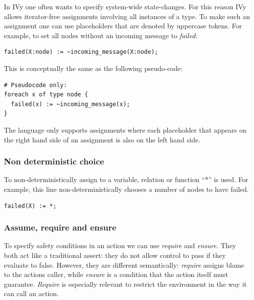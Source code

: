 \documentclass[fleqn]{article}
\begin{document}
In IVy one often wants to specify system-wide state-changes. For this reason IVy allows iterator-free assignments involving all instances of a type. To make such an assignment one can use placeholders that are denoted by uppercase tokens. For example, to set all nodes without an incoming message to \textit{failed}:

\begin{mdframed}[nobreak=true, backgroundcolor=light-gray, roundcorner=10pt,leftmargin=1, rightmargin=1, innerleftmargin=15, innertopmargin=15,innerbottommargin=15, outerlinewidth=1, linecolor=light-gray]
\begin{lstlisting}
failed(X:node) := ~incoming_message(X:node);
\end{lstlisting}
\end{mdframed}

\noindent This is conceptually the same as the following pseudo-code:

\begin{mdframed}[nobreak=true, backgroundcolor=light-gray, roundcorner=10pt,leftmargin=1, rightmargin=1, innerleftmargin=15, innertopmargin=15,innerbottommargin=15, outerlinewidth=1, linecolor=light-gray]
\begin{lstlisting}
# Pseudocode only:
foreach x of type node {
  failed(x) := ~incoming_message(x);
}
\end{lstlisting}
\end{mdframed}

The language only supports assignments where each placeholder that appears on the right hand side of an assignment is also on the left hand side.


\subsubsection{Non deterministic choice}
To non-deterministically assign to a variable, relation or function ``*'' is used.
For example, this line non-deterministically chooses a number of nodes to have failed.

\begin{mdframed}[nobreak=true, backgroundcolor=light-gray, roundcorner=10pt,leftmargin=1, rightmargin=1, innerleftmargin=15, innertopmargin=15,innerbottommargin=15, outerlinewidth=1, linecolor=light-gray]
\begin{lstlisting}
failed(X) := *;
\end{lstlisting}
\end{mdframed}

\subsubsection{Assume, require and ensure}
To specify safety conditions in an action we can use \textit{require} and \textit{ensure}.
They both act like a traditional assert: they do not allow control to pass if they evaluate to false.
However, they are different semantically: \textit{require} assigns blame to the actions caller, while \textit{ensure}
is a condition that the action itself must guarantee. \textit{Require} is especially relevant to restrict
the environment in the way it can call an action.
\end{document}
